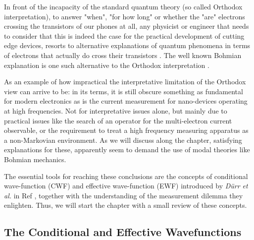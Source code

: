 \documentclass[11pt, a4paper]{article} %
\begin{document}
\newpage
{}
\setcounter{page}{1}

\hspace*{4mm} In front of the incapacity of the standard quantum theory (so called Orthodox interpretation), to answer "when", "for how long" or whether the "are" electrons crossing the transistors of our phones at all, any physicist or engineer that needs to consider that this is indeed the case for the practical development of cutting edge devices, resorts to alternative explanations of quantum phenomena in terms of electrons that actually do cross their transistors \cite{where}. The well known Bohmian explanation is one such alternative to the Orthodox interpretation \cite{Durr} \cite{JordiXavier}. 

As an example of how impractical the interpretative limitation of the Orthodox view can arrive to be: in its terms, it is still obscure something as fundamental for modern electronics as is the current measurement for nano-devices operating at high frequencies. Not for interpretative issues alone, but mainly due to practical issues like the search of an operator for the multi-electron current observable, or the requirement to treat a high frequency measuring apparatus as a non-Markovian environment. As we will discuss along the chapter, satisfying explanations for these, apparently seem to demand the use of modal theories like Bohmian mechanics. 

The essential tools for reaching these conclusions are the concepts of conditional wave-function (CWF) and effective wave-function (EWF) introduced by {\em Dürr et al.} in Ref \cite{Absolute}, together with the understanding of the measurement dilemma they enlighten. Thus, we will start the chapter with a small review of these concepts.
\vspace{-0.2cm}

\subsection*{The Conditional and Effective Wavefunctions}
\vspace{-0.2cm}
\end{document}
